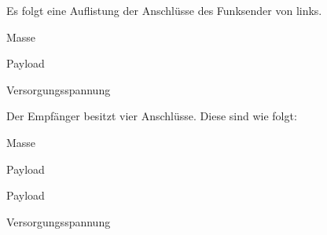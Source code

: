 \begin{figure}[H]
	\hspace*{-2cm}
	\caption{\funkempfaenger}
	\label{img:433_sender_empf}
\end{figure}

Es folgt eine Auflistung der Anschlüsse des Funksender von links.
\begin{description}[style=multiline,leftmargin=3cm]
\item [GND] 	Masse
\item [DATA]	Payload
\item [VCC]		Versorgungsspannung
\end{description}
\newpage
Der Empfänger besitzt vier Anschlüsse. Diese sind wie folgt:
\begin{description}[style=multiline,leftmargin=3cm]
\item [GND] 	Masse
\item [DATA]	Payload
\item [DATA]	Payload
\item [VCC]		Versorgungsspannung
\end{description}

